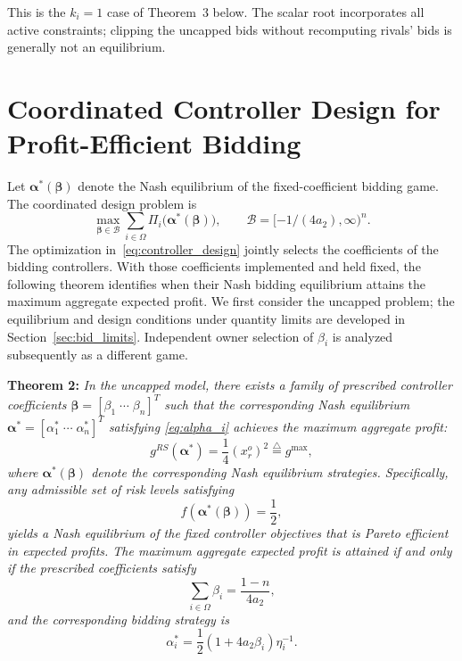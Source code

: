 \documentclass[journal]{IEEEtran}
\begin{document}
This is the $k_i=1$ case of Theorem~3 below. The scalar root incorporates all active constraints; clipping the uncapped bids without recomputing rivals' bids is generally not an equilibrium.

\section{Coordinated Controller Design for Profit-Efficient Bidding}

Let $\boldsymbol\alpha^*(\boldsymbol\beta)$ denote the Nash equilibrium of the fixed-coefficient bidding game. The coordinated design problem is
\begin{equation}
\max_{\boldsymbol\beta\in\mathcal B}
\sum_{i\in\Omega}\Pi_i\bigl(\boldsymbol\alpha^*(\boldsymbol\beta)\bigr),
\qquad \mathcal B=[-1/(4a_2),\infty)^n.
\label{eq:controller_design}
\end{equation}
The optimization in~\eqref{eq:controller_design} jointly selects the coefficients of the bidding controllers. With those coefficients implemented and held fixed, the following theorem identifies when their Nash bidding equilibrium attains the maximum aggregate expected profit. We first consider the uncapped problem; the equilibrium and design conditions under quantity limits are developed in Section~\ref{sec:bid_limits}. Independent owner selection of $\beta_i$ is analyzed subsequently as a different game.

\noindent\textbf{Theorem 2:} {\it In the uncapped model, there exists a family of prescribed controller coefficients $\boldsymbol{\beta}=[\beta_1 \; \cdots \; \beta_n]^T$ such that the corresponding Nash equilibrium  $\boldsymbol{\alpha}^*=[\alpha_1^* \; \cdots \; \alpha_n^*]^T$ satisfying \eqref{eq:alpha_i} achieves the maximum aggregate profit:
\[
g^{RS}(\boldsymbol{\alpha}^*)  = \frac{1}{4}(x_r^o)^2 \stackrel{\triangle}{=} g^{\max},
\]
where $\boldsymbol{\alpha}^*(\boldsymbol{\beta})$ denote the corresponding Nash equilibrium strategies. 
Specifically, any admissible set of risk levels satisfying
\begin{equation}
f(\boldsymbol{\alpha}^*(\boldsymbol{\beta})) = \frac{1}{2}, \label{eq:pareto_condition}
\end{equation}
yields a Nash equilibrium of the fixed controller objectives that is Pareto efficient in expected profits. The maximum aggregate expected profit is attained if and only if the prescribed coefficients satisfy
\begin{equation}
\sum_{i\in\Omega} \beta_i = \frac{1-n}{4a_2},
\label{eq:beta_sum_condition}
\end{equation}
and the corresponding bidding strategy is 
\begin{equation}
    \alpha_i^* = \frac{1}{2}(1+4a_2\beta_i)\eta_i^{-1}. \label{eq:alpha_optimal}
\end{equation}}
\end{document}
